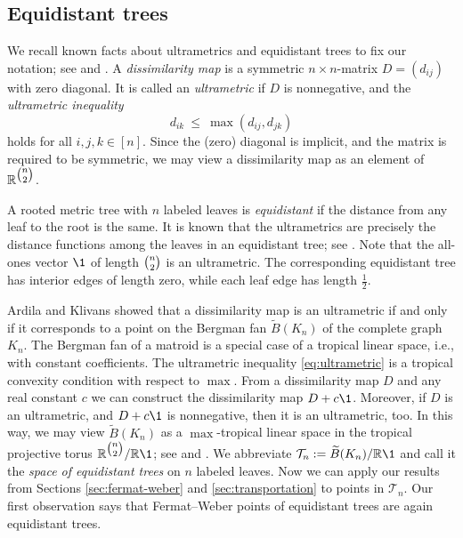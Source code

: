 \documentclass[a4paper,12pt]{amsart}
\newcommand\RR{{\mathbb R}}
\newcommand\cT{{\mathcal T}}
\newcommand\torus[1]{\RR^{#1}/\RR\1} %
\newcommand\BergmanFan{{\widetilde B}}
\theoremstyle{remark}
\begin{document}
\subsection{Equidistant trees}
We recall known facts about ultrametrics and equidistant trees to fix our notation; see \cite[\S7.2]{SempleSteel:2003} and \cite[\S10.9]{ETC}.
A \emph{dissimilarity map} is a symmetric $n{\times}n$-matrix $D=(d_{ij})$ with zero diagonal.
It is called an \emph{ultrametric} if $D$ is nonnegative, and the \emph{ultrametric inequality}
\begin{equation}\label{eq:ultrametric}
  d_{ik} \ \leq \ \max (d_{ij} , d_{jk})
\end{equation}
holds for all $i,j,k\in[n]$.
Since the (zero) diagonal is implicit, and the matrix is required to be symmetric, we may view a dissimilarity map as an element of $\RR^{\tbinom{n}{2}}$.

A rooted metric tree with $n$ labeled leaves is \emph{equidistant} if the distance from any leaf to the root is the same.
It is known that the ultrametrics are precisely the distance functions among the leaves in an equidistant tree; see \cite[Theorem 7.2.5]{SempleSteel:2003}.
Note that the all-ones vector $\1$ of length $\tbinom{n}{2}$ is an ultrametric.
The corresponding equidistant tree has interior edges of length zero, while each leaf edge has length $\tfrac{1}{2}$.

Ardila and Klivans \cite[Theorem 3]{ArdilaKlivans:2006} showed that a dissimilarity map is an ultrametric if and only if it corresponds to a point on the Bergman fan $\BergmanFan(K_n)$ of the complete graph $K_n$.
The Bergman fan of a matroid is a special case of a tropical linear space, i.e., with constant coefficients.
The ultrametric inequality \eqref{eq:ultrametric} is a tropical convexity condition with respect to $\max$.
From a dissimilarity map $D$ and any real constant $c$ we can construct the dissimilarity map $D+c\1$.
Moreover, if $D$ is an ultrametric, and $D+c\1$ is nonnegative, then it is an ultrametric, too.
In this way, we may view $\BergmanFan(K_n)$ as a $\max$-tropical linear space in the tropical projective torus $\torus{\tbinom{n}{2}}$; see \cite[Proposition 16]{ConvTreeSp} and \cite[Theorem~3]{YoshidaZhangZhang:2019}.
We abbreviate $\cT_n:=\BergmanFan(K_n)/\RR\1$ and call it the \emph{space of equidistant trees} on $n$ labeled leaves.
Now we can apply our results from Sections \ref{sec:fermat-weber} and \ref{sec:transportation} to points in $\cT_n$.
Our first observation says that Fermat--Weber points of equidistant trees are again equidistant trees.
\end{document}
